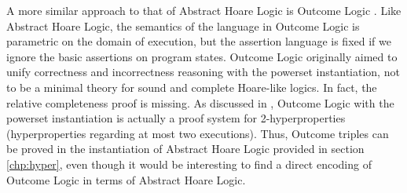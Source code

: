 A more similar approach to that of Abstract Hoare Logic is Outcome Logic
\cite{Zilberstein23}. Like Abstract Hoare Logic, the semantics of the language
in Outcome Logic is parametric on the domain of execution, but the assertion
language is fixed if we ignore the basic assertions on program states. Outcome
Logic originally aimed to unify correctness and incorrectness reasoning with
the powerset instantiation, not to be a minimal theory for sound and complete
Hoare-like logics. In fact, the relative completeness proof is missing. As
discussed in \cite{Darnier2023}, Outcome Logic with the powerset instantiation
is actually a proof system for 2-hyperproperties (hyperproperties regarding at
most two executions). Thus, Outcome triples can be proved in the instantiation
of Abstract Hoare Logic provided in section \ref{chp:hyper}, even though it
would be interesting to find a direct encoding of Outcome Logic in terms of
Abstract Hoare Logic.
